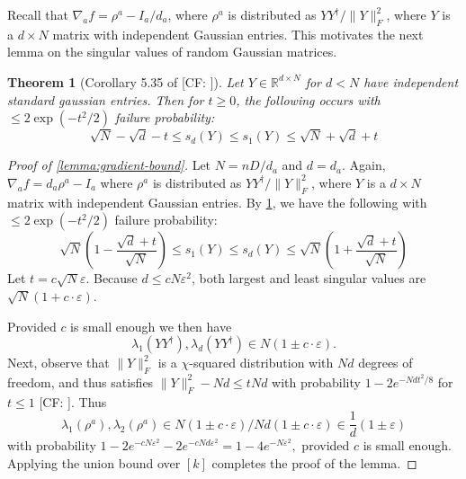 \documentclass{article}
\newtheorem{theorem}{Theorem}
\newcommand{\R}{{\mathbb{R}}}
\renewcommand{\vec}{\bm}
\newcommand\eps{\varepsilon}
\newcommand{\CF}[1]{{\color{purple}[CF: #1]}}
\begin{document}
Recall that $\nabla_a f = \rho^a - I_a/d_a$, where $\rho^a$ is distributed as $Y Y^\dagger/\|Y\|_F^2$, where $Y$ is a $d \times N$ matrix with independent Gaussian entries. This motivates the next lemma on the singular values of random Gaussian matrices.

\begin{theorem} [Corollary 5.35 of \CF{\cite{vershinyn}}]\label{cor:vershynin}
Let $Y \in \R^{d \times N}$ for $d < N$ have independent standard gaussian entries. Then for $t \geq 0$, the following occurs with $\leq 2 \exp(-t^{2}/2)$ failure probability:
\[ \sqrt{N} - \sqrt{d} - t \leq s_{d}(Y) \leq s_{1}(Y) \leq \sqrt{N} + \sqrt{d} + t  \]
\end{theorem}
\begin{proof}[Proof of \cref{lemma:gradient-bound}]Let $N = n D/d_a$ and $d = d_a$. Again, $\nabla_a f = d_a \rho^a - I_a$ where $\rho^a$ is distributed as $Y Y^\dagger/\|Y\|_F^2$, where $Y$ is a $d \times N$ matrix with independent Gaussian entries.
By \cref{cor:vershynin}, we have the following with $\leq 2 \exp(-t^{2}/2)$ failure probability:
\[\sqrt{N} \left( 1 -  \frac{\sqrt{d} + t }{\sqrt{N}}  \right)\leq  s_{1} \left( Y \right) \leq s_{d}\left( Y \right) \leq  \sqrt{N} \left( 1 + \frac{\sqrt{d} + t }{\sqrt{N}}  \right)  \]
Let $t = c \sqrt{N} \eps$. Because $d \leq c N \eps^2$, both largest and least singular values are
$\sqrt{N} \left( 1 + c \cdot \eps   \right)$. 

Provided $c$ is small enough we then have 
 $$\lambda_1(YY^\dagger), \lambda_{d}(YY^\dagger) \in N(1 \pm c \cdot \eps).$$ 
 Next, observe that $\|Y\|_F^2$ is a $\chi$-squared distribution with $Nd$ degrees of freedom, and thus satisfies $\| Y\|_F^2 - Nd \leq t N d$ with probability $1 - 2e^{- Nd t^2/8}$ for $t \leq 1$ \CF{\cite{wainwright}}. Thus 
  $$\lambda_1(\rho^a), \lambda_2(\rho^a) \in  N(1 \pm c \cdot \eps)/ Nd(1 \pm c \cdot \eps) \in \frac{1}{d}(1 \pm \eps)$$ 
with probability $1 - 2 e^{- c N \eps^2}- 2 e^{- c Nd \eps^2} = 1 - 4 e^{- N\eps^2},$ provided $c$ is small enough. Applying the union bound over $[k]$ completes the proof of the lemma.\end{proof}
 


 
\end{document}
